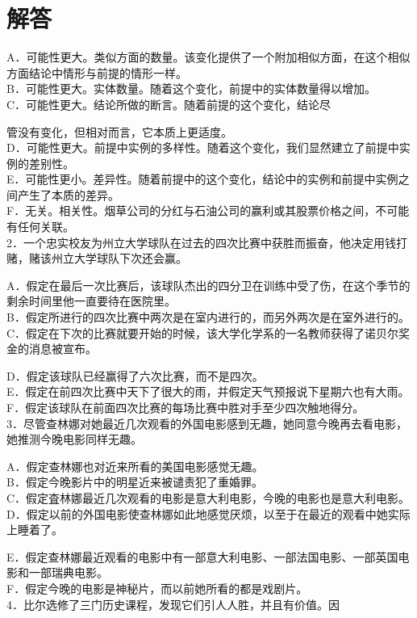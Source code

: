 \section*{解答}
A．可能性更大。类似方面的数量。该变化提供了一个附加相似方面，在这个相似方面结论中情形与前提的情形一样。\\
B．可能性更大。实体数量。随着这个变化，前提中的实体数量得以增加。\\
C．可能性更大。结论所做的断言。随着前提的这个变化，结论尽

管没有变化，但相对而言，它本质上更适度。\\
D．可能性更大。前提中实例的多样性。随着这个变化，我们显然建立了前提中实例的差别性。\\
E．可能性更小。差异性。随着前提中的这个变化，结论中的实例和前提中实例之间产生了本质的差异。\\
F．无关。相关性。烟草公司的分红与石油公司的赢利或其股票价格之间，不可能有任何关联。\\
2．一个忠实校友为州立大学球队在过去的四次比赛中获胜而振奋，他决定用钱打赌，赌该州立大学球队下次还会赢。

A．假定在最后一次比赛后，该球队杰出的四分卫在训练中受了伤，在这个季节的剩余时间里他一直要待在医院里。\\
B．假定所进行的四次比赛中两次是在室内进行的，而另外两次是在室外进行的。\\
C．假定在下次的比赛就要开始的时候，该大学化学系的一名教师获得了诺贝尔奖金的消息被宣布。

D．假定该球队已经赢得了六次比赛，而不是四次。\\
E．假定在前四次比赛中天下了很大的雨，并假定天气预报说下星期六也有大雨。\\
F．假定该球队在前面四次比赛的每场比赛中胜对手至少四次触地得分。\\
3．尽管查林娜对她最近几次观看的外国电影感到无趣，她同意今晚再去看电影，她推测今晚电影同样无趣。

A．假定查林娜也对近来所看的美国电影感觉无趣。\\
B．假定今晚影片中的明星近来被谴责犯了重婚罪。\\
C．假定査林娜最近几次观看的电影是意大利电影，今晚的电影也是意大利电影。\\
D．假定以前的外国电影使查林娜如此地感觉厌烦，以至于在最近的观看中她实际上睡着了。

E．假定查林娜最近观看的电影中有一部意大利电影、一部法国电影、一部英国电影和一部瑞典电影。\\
F．假定今晚的电影是神秘片，而以前她所看的都是戏剧片。\\
4．比尔选修了三门历史课程，发现它们引人人胜，并且有价值。因

